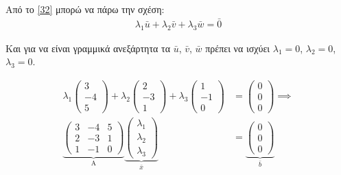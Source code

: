 \documentclass[12pt]{extreport}
\begin{document}
Από το \eqref{32} μπορώ να πάρω την σχέση:
\begin{equation}%
    \begin{aligned}
        \lambda_{1}\bar{u} + \lambda_{2}\bar{v} + \lambda_{3}\bar{w} = \bar{0}
    \end{aligned}\label{33}
\end{equation}

Και για  να είναι γραμμικά ανεξάρτητα τα $\bar{u}$, $\bar{v}$, $\bar{w}$ πρέπει να ισχύει $\lambda_{1}=0$, $\lambda_{2}=0$, $\lambda_{3}=0$.

\begin{equation}%
    \begin{aligned}
        \lambda_{1}\begin{pmatrix}
            3 \\ -4 \\ 5
        \end{pmatrix} +
        \lambda_{2}\begin{pmatrix}
            2 \\ -3 \\ 1
        \end{pmatrix} +
        \lambda_{3}\begin{pmatrix}
            1 \\ -1 \\ 0
        \end{pmatrix}        & =
        \begin{pmatrix}
            0 \\ 0 \\ 0
        \end{pmatrix}
        \implies                                         \\
        \underbrace{
            \begin{pmatrix}
                3 & -4 & 5 \\
                2 & -3 & 1 \\
                1 & -1 & 0
            \end{pmatrix}}_\text{A}
        \underbrace{
        \begin{pmatrix}
                \lambda_{1} \\
                \lambda_{2} \\
                \lambda_{3}
            \end{pmatrix}}_\text{$\bar{x}$} & =
        \underbrace{
            \begin{pmatrix}
                0 \\
                0 \\
                0
            \end{pmatrix}}_\text{$\bar{b}$}
    \end{aligned}\label{34}
\end{equation}
\end{document}
